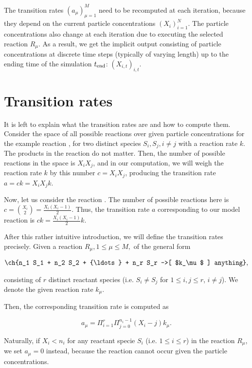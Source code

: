 The transition rates $(a_\mu)_{\mu=1}^M$ need to be recomputed at each iteration, because they depend on the current particle concentrations $(X_i)_{i=1}^N$. The particle concentrations also change at each iteration due to executing the selected reaction $R_\mu$. As a result, we get the implicit output consisting of particle concentrations at discrete time steps (typically of varying length) up to the ending time of the simulation $t_{\rm{end}}$: $(X_{i, t})_{i, t}$. 

\section{Transition rates}

It is left to explain what the transition rates are and how to compute them. Consider the space of all possible reactions over given particle concentrations for the example reaction , for two distinct species $S_i, S_j, i \neq j$ with a reaction rate $k$. The products in the reaction do not matter. Then, the number of possible reactions in the space is $X_iX_j$, and in our computation, we will weigh the reaction rate $k$ by this number $c = X_iX_j$, producing the transition rate $a = ck = X_iX_jk$.

Now, let us consider the reaction . The number of possible reactions here is $c = {X_i \choose 2} = \frac{X_i(X_i - 1)}{2}$. Thus, the transition rate $a$ corresponding to our model reaction is $ck = \frac{X_i(X_i - 1)}{2}k$.

After this rather intuitive introduction, we will define the transition rates precisely. Given a reaction $R_\mu, 1 \leq \mu \leq M, $ of the general form 

\begin{center}
\begin{gather*}
\ch{n_1 S_1 + n_2 S_2 + {\ldots} + n_r S_r ->[ $k_\mu$ ] anything}, 
\end{gather*}
\end{center}

consisting of $r$ distinct reactant species (i.e. $S_i \neq S_j$ for $1 \leq i, j \leq r$, $i \neq j$). We denote the given reaction rate $k_\mu$.

Then, the corresponding transition rate is computed as 

$$
a_\mu = \Pi_{i=1}^{r} \Pi_{j = 0}^{n_i - 1} \left( X_i - j \right) k_\mu.
$$

Naturally, if $X_i < n_i$ for any reactant specie $S_i$ (i.e. $1 \leq i \leq r$) in the reaction $R_\mu$, we set $a_\mu = 0$ instead, because the reaction cannot occur given the particle concentrations.


